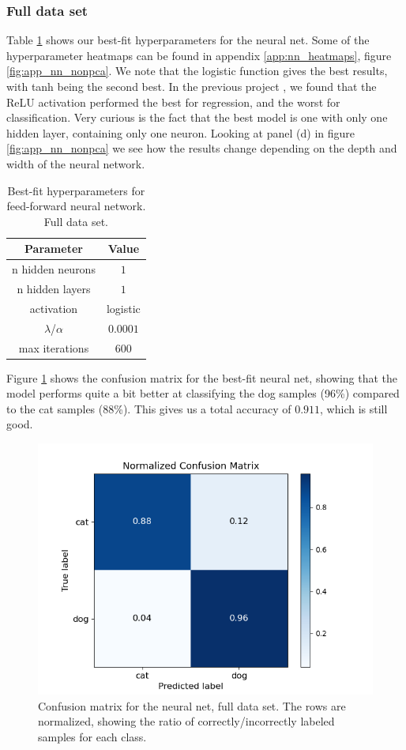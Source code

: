 \documentclass[a4paper]{article}
\begin{document}
\subsubsection{Full data set}
Table \ref{tab:best_fit_nn_nonpca} shows our best-fit hyperparameters for the neural net. Some of the hyperparameter heatmaps can be found in appendix \ref{app:nn_heatmaps}, figure \ref{fig:app_nn_nonpca}. We note that the logistic function gives the best results, with tanh being the second best. In the previous project \cite{Github2}, we found that the ReLU activation performed the best for regression, and the worst for classification. Very curious is the fact that the best model is one with only one hidden layer, containing only one neuron. Looking at panel (d) in figure \ref{fig:app_nn_nonpca} we see how the results change depending on the depth and width of the neural network.
\begin{table}[H]
  \centering
  \caption{Best-fit hyperparameters for feed-forward neural network. Full data set.}
  \label{tab:best_fit_nn_nonpca}
  \begin{tabular}{c|c}
    \hline\hline
    Parameter & Value\\\hline
    n hidden neurons &  $1$\\
    n hidden layers &  $1$\\
    activation & logistic \\
    $\lambda$/$\alpha$  & $0.0001$\\
    max iterations & $600$
    \end{tabular}
\end{table}
Figure \ref{fig:nn_confusion_nonpca} shows the confusion matrix for the best-fit neural net, showing that the model performs quite a bit better at classifying the dog samples (96\%) compared to the cat samples (88\%). This gives us a total accuracy of $0.911$, which is still good.
\begin{figure}[H]
	\centering
	\includegraphics[scale=0.7]{../figures/neural_net/confusion_matrix_nbins200_pca0_seed4155_ts0.20.png}
	\caption{Confusion matrix for the neural net, full data set. The rows are normalized, showing the ratio of correctly/incorrectly labeled samples for each class.}
	\label{fig:nn_confusion_nonpca}
\end{figure}	
\end{document}

